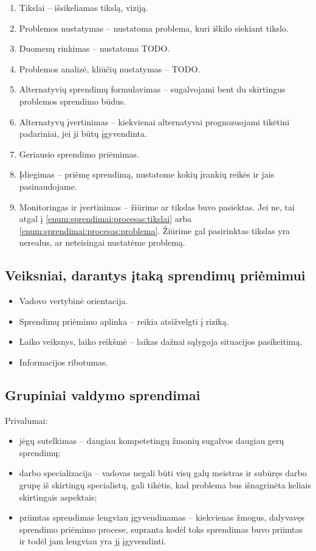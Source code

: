 \begin{enumerate}
  \item \label{enum:sprendimai:procesas:tikslai} Tikslai – išsikeliamas
    tikslą, viziją.
  \item \label{enum:sprendimai:procesas:problema} Problemos nustatymas
    – nustatoma problema, kuri iškilo siekiant tikslo.
  \item Duomenų rinkimas – nustatoma TODO.
  \item Problemos analizė, kliūčių nustatymas – TODO.
  \item Alternatyvių sprendimų formulavimas – sugalvojami bent du
    skirtingus problemos sprendimo būdus.
  \item Alternatyvų įvertinimas – kiekvienai alternatyvai prognozuojami
    tikėtini padariniai, jei ji būtų įgyvendinta.
  \item Geriausio sprendimo priėmimas.
  \item Įdiegimas – priėmę sprendimą, nustatome kokių įrankių reikės
    ir jais pasinaudojame.
  \item Monitoringas ir įvertinimas – žiūrime ar tikslas buvo pasiektas.
    Jei ne, tai atgal į \ref{enum:sprendimai:procesas:tikslai} arba
    \ref{enum:sprendimai:procesas:problema}. Žiūrime gal pasirinktas
    tikslas yra nerealus, ar neteisingai nustatėme problemą.
\end{enumerate}

\subsection{Veiksniai, darantys įtaką sprendimų priėmimui}

\begin{itemize}
  \item Vadovo vertybinė orientacija.
  \item Sprendimų priėmimo aplinka – reikia atsižvelgti į riziką.
  \item Laiko veiksnys, laiko reikšmė – laikas dažnai sąlygoja situacijos
    pasikeitimą.
  \item Informacijos ribotumas.
\end{itemize}

\subsection{Grupiniai valdymo sprendimai}

Privalumai:
\begin{itemize}
  \item jėgų sutelkimas – daugiau kompetetingų žmonių sugalvos daugiau
    gerų sprendimų;
  \item darbo specializacija – vadovas negali būti visų galų meistras
    ir subūręs darbo grupę iš skirtingų specialistų, gali tikėtis,
    kad problema bus išnagrinėta keliais skirtingais aspektais;
  \item priimtas sprendimas lengviau įgyvendinamas – kiekvienas žmogus,
    dalyvavęs sprendimo priėmimo procese, supranta kodėl toks sprendimas
    buvo priimtas ir todėl jam lengviau yra jį įgyvendinti.
\end{itemize}

